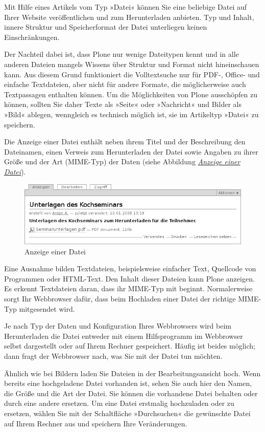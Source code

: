 \documentclass[a4paper,12pt,ngerman]{manual}
\begin{document}
Mit Hilfe eines Artikels vom Typ »Datei« können Sie eine beliebige Datei auf
Ihrer Website veröffentlichen und zum Herunterladen anbieten. Typ und Inhalt,
innere Struktur und Speicherformat der Datei unterliegen keinen
Einschränkungen.

Der Nachteil dabei ist, dass Plone nur wenige Dateitypen kennt und in alle
anderen Dateien mangels Wissens über Struktur und Format nicht hineinschauen
kann. Aus diesem Grund funktioniert die Volltextsuche nur für PDF-, Office-
und einfache Textdateien, aber nicht für andere Formate, die möglicherweise
auch Textpassagen enthalten können.
Um die Möglichkeiten von Plone ausschöpfen zu können, sollten Sie daher Texte
als »Seite« oder »Nachricht« und Bilder als »Bild« ablegen,
wenngleich es technisch möglich ist, sie im Artikeltyp »Datei« zu speichern.

Die Anzeige einer Datei enthält neben ihrem Titel und der Beschreibung den
Dateinamen, einen Verweis zum Herunterladen der Datei sowie Angaben zu ihrer
Größe und der Art (MIME-Typ) der Daten (siehe Abbildung \hyperlink{fig-datei}{\emph{Anzeige einer Datei}}).
\hypertarget{fig-datei}{}\begin{figure}[htbp]
\centering

\includegraphics{datei.png}
\caption{Anzeige einer Datei}\end{figure}

Eine Ausnahme bilden Textdateien, beispielsweise einfacher Text, Quellcode von
Programmen oder HTML-Text. Den Inhalt dieser Dateien kann Plone anzeigen. Es
erkennt Textdateien daran, dass ihr MIME-Typ mit 
beginnt. Normalerweise sorgt Ihr Webbrowser dafür, dass beim Hochladen einer
Datei der richtige MIME-Typ mitgesendet wird.

Je nach Typ der Daten und Konfiguration Ihres Webbrowsers wird beim
Herunterladen die Datei entweder mit einem Hilfsprogramm im Webbrowser selbst
dargestellt oder auf Ihrem Rechner gespeichert. Häufig ist beides möglich;
dann fragt der Webbrowser nach, was Sie mit der Datei tun möchten.

Ähnlich wie bei Bildern laden Sie Dateien in der Bearbeitungsansicht hoch.
Wenn bereits eine hochgeladene Datei vorhanden ist, sehen Sie auch hier den
Namen, die Größe und die Art der Datei. Sie können die vorhandene Datei
behalten oder durch eine andere ersetzen. Um eine Datei erstmalig hochzuladen
oder zu ersetzen, wählen Sie mit der Schaltfläche »Durchsuchen« die
gewünschte Datei auf Ihrem Rechner aus und speichern Ihre Veränderungen.
\end{document}
